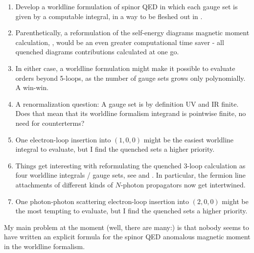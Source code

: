     \begin{enumerate}
  \item
Develop a worldline formulation of spinor QED in which each gauge set is
given by a computable integral, in a way to be fleshed out in
.
  \item
Parenthetically, a reformulation of the self-energy diagrams magnetic
moment calculation, , would be an even greater
computational time saver - all quenched diagrams contributions calculated
at one go.
  \item
In either case, a
worldline formulation might make it possible to evaluate orders beyond
5-loops, as the number of gauge sets grows only polynomially. A win-win.
  \item
A renormalization question:
A gauge set is by definition UV and IR finite. Does that mean
that its worldline formalism integrand is pointwise finite, no need for
counterterms?
  \item
One electron-loop insertion into $(1,0,0)$  might be the easiest
worldline integral to
evaluate, but I find the quenched sets a higher priority.
  \item
Things get interesting with reformulating the quenched 3-loop calculation
as four worldline integrals / gauge sets, see  and
. In particular, the fermion line attachments of
different kinds of $N$-photon propagators now get intertwined.
  \item
One photon-photon scattering electron-loop insertion into $(2,0,0)$ might
be the most tempting to evaluate, but I find the quenched sets a higher
priority.
    \end{enumerate}
My main problem at the moment (well, there are many:) is that nobody
seems to have written an explicit formula for the spinor QED anomalous
magnetic moment in the worldline formalism.
